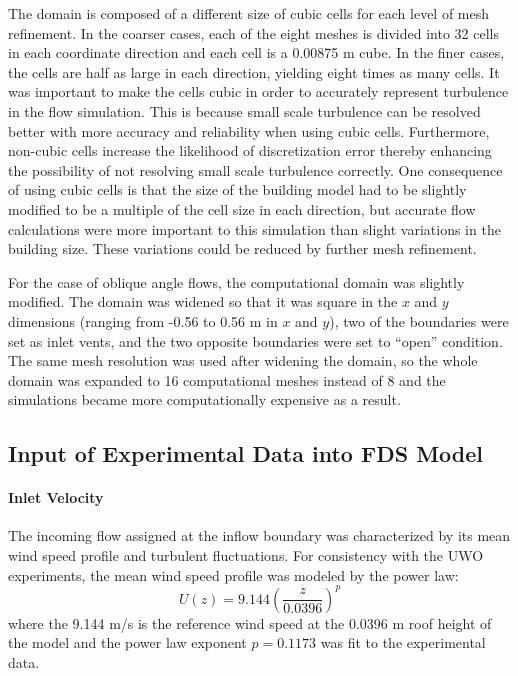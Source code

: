 The domain is composed of a different size of cubic cells for each level of mesh refinement. In the coarser cases, each of the eight meshes is divided into 32 cells in each coordinate direction and each cell is a 0.00875 m cube. In the finer cases, the cells are half as large in each direction, yielding eight times as many cells. It was important to make the cells cubic in order to accurately represent turbulence in the flow simulation. This is because small scale turbulence can be resolved better with more accuracy and reliability when using cubic cells. Furthermore, non-cubic cells increase the likelihood of discretization error thereby enhancing the possibility of not resolving small scale turbulence correctly. One consequence of using cubic cells is that the size of the building model had to be slightly modified to be a multiple of the cell size in each direction, but accurate flow calculations were more important to this simulation than slight variations in the building size. These variations could be reduced by further mesh refinement.

For the case of oblique angle flows, the computational domain was slightly modified. The domain was widened so that it was square in the $x$ and $y$ dimensions (ranging from -0.56 to 0.56 m in $x$ and $y$), two of the boundaries were set as inlet vents, and the two opposite boundaries were set to ``open'' condition. The same mesh resolution was used after widening the domain, so the whole domain was expanded to 16 computational meshes instead of 8 and the simulations became more computationally expensive as a result.

\subsection{Input of Experimental Data into FDS Model}

\paragraph{Inlet Velocity}
The incoming flow assigned at the inflow boundary was characterized by its mean wind speed profile and turbulent fluctuations. For consistency with the UWO experiments, the mean wind speed profile was modeled by the power law:
\begin{equation}
U(z) = 9.144 \left(\frac{z}{0.0396}\right)^p
\end{equation}
where the 9.144 m/s is the reference wind speed at the 0.0396 m roof height of the model and the power law exponent $p=0.1173$ was fit to the experimental data.

